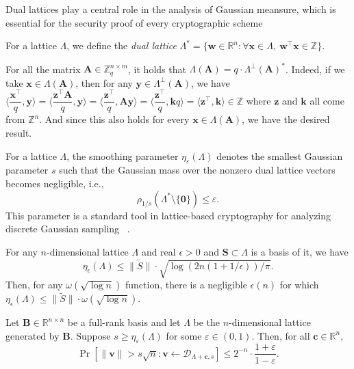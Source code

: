Dual lattices play a central role in the analysis of Gaussian meansure, which is essential for the security proof of every cryptographic scheme


\begin{definition}
For a lattice $\Lambda$, we define the \emph{dual lattice}
$\Lambda^* = \{\mathbf{w} \in \mathbb{R}^n : \forall \mathbf{x} \in \Lambda,\ \mathbf{w}^{\top}\mathbf{x} \in \mathbb{Z}\}$.
\end{definition}
\noindent For all the matrix $\mathbf{A} \in \mathbb{Z}_q^{n \times m}$, it holds that $\Lambda(\mathbf{A}) = q \cdot \Lambda^\perp(\mathbf{A})^*$. Indeed, if we take $\mathbf{x} \in \Lambda(\mathbf{A})$, then for any $\mathbf{y} \in \Lambda^\perp(\mathbf{A})$, we have $\big \langle \dfrac{\mathbf{x}^\top}{q},\mathbf{y}\big\rangle= \big \langle \dfrac{\mathbf{z}^\top\mathbf{A}}{q},\mathbf{y}\big\rangle = \big \langle \dfrac{\mathbf{z}^\top}{q},\mathbf{A}\mathbf{y}\big\rangle=\big \langle \dfrac{\mathbf{z}^\top}{q},\mathbf{k}q\big\rangle =\big \langle \mathbf{z}^\top,\mathbf{k}\big\rangle \in \mathbb{Z}$ where $\mathbf{z}$ and $\mathbf{k}$ all come from $\mathbb{Z}^n$. And since this also holds for every $\mathbf{x} \in \Lambda(\mathbf{A})$, we have the desired result. 

For a lattice $\Lambda$, the smoothing parameter $\eta_{\varepsilon}(\Lambda)$ denotes the smallest Gaussian parameter $s$ such that the Gaussian mass over the nonzero dual lattice vectors becomes negligible, i.e.,
\[
\rho_{1/s}(\Lambda^* \setminus \{\mathbf{0}\}) \le \varepsilon.
\]
This parameter is a standard tool in lattice-based cryptography for analyzing discrete Gaussian sampling ~\cite{J:MicReg07}.

\begin{lemma}
\label{lem:1}
For any $n$-dimensional lattice $\Lambda$ and real $\epsilon > 0$ and $\mathbf{S} \subset \Lambda$ is a basis of it, we have
\[
\eta_{\epsilon}(\Lambda)
\leq
\|\widetilde{S}\|
\cdot
\sqrt{\log(2n(1+1/\epsilon))/\pi}.
\]
Then, for any $\omega(\sqrt{\log n})$ function, there is a negligible
$\epsilon(n)$ for which
$
\eta_{\epsilon}(\Lambda)
\leq
\|\widetilde{S}\|\cdot \omega(\sqrt{\log n}).
$
\end{lemma}

\begin{lemma}
\label{lem:2}
Let $\mathbf{B} \in \mathbb{R}^{n \times n}$ be a full-rank basis and let
$\Lambda$ be the $n$-dimensional lattice generated by $\mathbf{B}$.
Suppose $s \ge \eta_{\varepsilon}(\Lambda)$ for some
$\varepsilon \in (0,1)$. Then, for all $\mathbf{c} \in \mathbb{R}^n$,
\[
\Pr\left[
    \|\mathbf{v}\| > s\sqrt{n}
    :
    \mathbf{v} \leftarrow \mathcal{D}_{\Lambda+\mathbf{c},s}
\right]
\le
2^{-n}\cdot \frac{1+\varepsilon}{1-\varepsilon}.
\]
\end{lemma}


